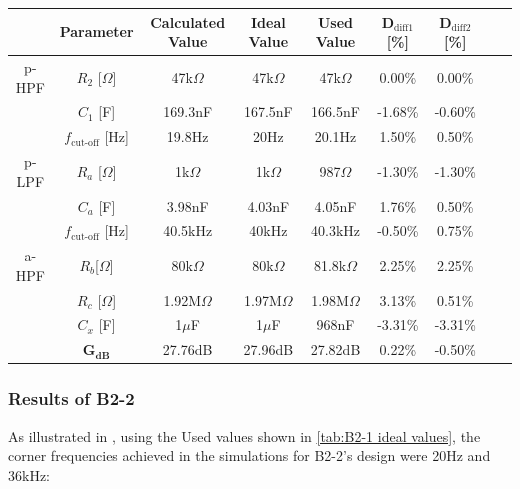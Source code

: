 \begin{table}[H]
{\begin{tabular}{c @{\hspace{12pt}} *7{c} S @{\hspace{12pt}}}
        & Parameter & Calculated Value & Ideal Value & Used Value & D$_{\text{diff} 1}$ [\%] & D$_{\text{diff} 2}$ [\%]  \\
        \midrule
        p-HPF & $R_2$ [$\Omega$] & 47k$\Omega$ & 47k$\Omega$ &  47k$\Omega$ &0.00\%  & 0.00\% \\
         & $C_1$ [F] & 169.3nF & 167.5nF &166.5nF & -1.68\%&  -0.60\% \vspace{4pt} \\
         & $f_\text{cut-off}$ [Hz] & 19.8Hz & 20Hz &20.1Hz & 1.50\% &  0.50\% \vspace{10pt} \\
        p-LPF & $R_a$ [$\Omega$] & 1k$\Omega$ &  1k$\Omega$ & 987$\Omega$ & -1.30\%  & -1.30\% \\
         & $C_a$ [F] & 3.98nF & 4.03nF & 4.05nF & 1.76\%& 0.50\%    \vspace{4pt}\\
         & $f_\text{cut-off}$ [Hz] & 40.5kHz & 40kHz & 40.3kHz & -0.50\% & 0.75\% \vspace{10pt}\\
        a-HPF &  $R_b$[$\Omega$] & 80k$\Omega$ & 80k$\Omega$ & 81.8k$\Omega$ & 2.25\% & 2.25\%  \\
        & $R_c$ [$\Omega$] & 1.92M$\Omega$ & 1.97M$\Omega$ & 1.98M$\Omega$ & 3.13\% &  0.51\% \\
         & $C_x$ [F] & 1$\mu$F & 1$\mu$F & 968nF & -3.31\%  &  -3.31\%  \vspace{4pt} \\
         & $\mathbf{G_{\text{dB}}}$  & 27.76dB & 27.96dB & 27.82dB & 0.22\% &  -0.50\%  \\
        \bottomrule
    \end{tabular}
    }
    
    \label{tab: B2-1 actual ideal values}
\end{table}

\subsubsection{Results of B2-2}
As illustrated in , using the Used values shown in \autoref{tab:B2-1 ideal values}, the corner frequencies achieved in the simulations for B2-2's design were 20Hz and 36kHz:

